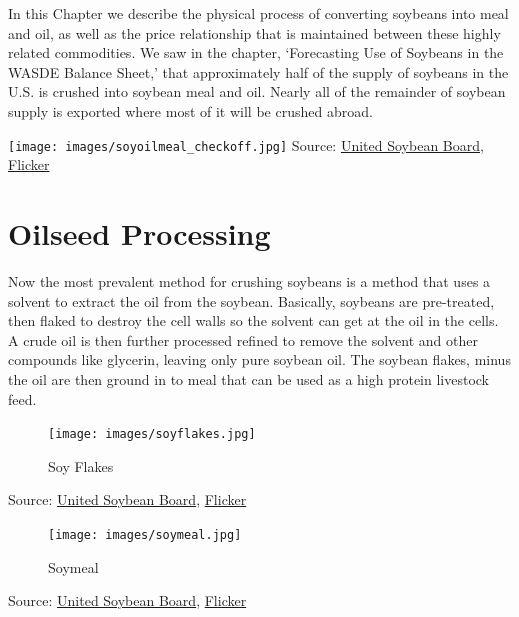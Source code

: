 \documentclass[
]{book}
\begin{document}
In this Chapter we describe the physical process of converting soybeans into meal and oil, as well as the price relationship that is maintained between these highly related commodities. We saw in the chapter, `Forecasting Use of Soybeans in the WASDE Balance Sheet,' that approximately half of the supply of soybeans in the U.S. is crushed into soybean meal and oil. Nearly all of the remainder of soybean supply is exported where most of it will be crushed abroad.

\texttt{[image: images/soyoilmeal\_checkoff.jpg]} Source: \href{http://unitedsoybean.org/}{United Soybean Board}, \href{https://www.flickr.com/photos/unitedsoybean/10059732523/in/photolist-gjWL1c-iSHsD6-gjRZN5-gjSiez-gjRDSm-3GTus-gjT5Pf-gjT5FQ-gjT5Zf-iRrGux-5mxrJp-iRuCDS-fEhEb4-iSHt56-gjSLAj-gjTptX-gjSLDL-gjSNeR-gjSLEC-gjT72q-6m2BCX-gjSUHT-gjTpzi-6m6Jay-qBtpPq-5wBq3U-gjWLbe-aMpXNc-qRDdLA-gjWY8m-rujuvk-iRqECD-rNDaeg-GL7Qd-6m2Yyc-6JGi4H-ar3khU-cNjfUf-6m2A3g-aE4dw4-c3VUt9-c3VVq5-4JzMWS-6KY45z-6m2Xsv-6m6Eny-6m2XZg-6m2WVa-6m2ZFF-6m7ad1}{Flicker}

\hypertarget{oilseed-processing}{%
\section{Oilseed Processing}\label{oilseed-processing}}

Now the most prevalent method for crushing soybeans is a method that uses a solvent to extract the oil from the soybean. Basically, soybeans are pre-treated, then flaked to destroy the cell walls so the solvent can get at the oil in the cells. A crude oil is then further processed refined to remove the solvent and other compounds like glycerin, leaving only pure soybean oil. The soybean flakes, minus the oil are then ground in to meal that can be used as a high protein livestock feed.

\begin{figure}
\centering
\texttt{[image: images/soyflakes.jpg]}
\caption{Soy Flakes}
\end{figure}

Source: \href{http://unitedsoybean.org/}{United Soybean Board}, \href{https://www.flickr.com/photos/unitedsoybean/10059015936/}{Flicker}

\begin{figure}
\centering
\texttt{[image: images/soymeal.jpg]}
\caption{Soymeal}
\end{figure}

Source: \href{http://unitedsoybean.org/}{United Soybean Board}, \href{https://www.flickr.com/photos/unitedsoybean/10059074033/}{Flicker}
\end{document}
